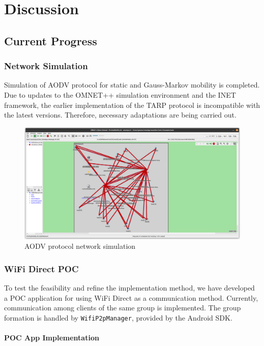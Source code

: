 \section{Discussion}
\subsection{Current Progress}
\subsubsection{Network Simulation}

Simulation of AODV protocol for static and Gauss-Markov mobility is completed.
Due to updates to the OMNET++ simulation environment and the INET framework,
the earlier implementation of the TARP protocol is incompatible with the latest
versions. Therefore, necessary adaptations are being carried out.

\begin{figure}[htbp]
    \centerline{\includegraphics[height=0.45\textwidth]{imgs/aodvSim.png}}
    \caption{AODV protocol network simulation}
    \label{aodvSim}
\end{figure}

\subsubsection{WiFi Direct POC}

To test the feasibility and refine the implementation method, we have developed
a POC application for using WiFi Direct as a communication method. Currently,
communication among clients of the same group is implemented. The group
formation is handled by \texttt{WifiP2pManager}, provided by the Android
SDK\cite{wifiman}.

\vspace{0.3cm}

\paragraph{POC App Implementation}

